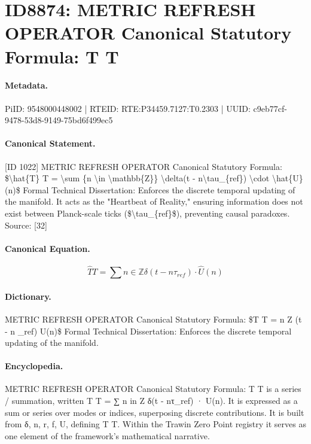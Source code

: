 \section*{ID8874: METRIC REFRESH OPERATOR Canonical Statutory Formula: T T}
\paragraph{Metadata.}
PiID: 9548000448002 | RTEID: RTE:P34459.7127:T0.2303 | UUID: c9eb77cf-9478-53d8-9149-75bd6f499ec5

\paragraph{Canonical Statement.}
[ID 1022] METRIC REFRESH OPERATOR Canonical Statutory Formula: \$\textbackslash{}hat\{T\} T = \textbackslash{}sum \{n \textbackslash{}in \textbackslash{}mathbb\{Z\}\} \textbackslash{}delta(t - n\textbackslash{}tau\_\{ref\}) \textbackslash{}cdot \textbackslash{}hat\{U\}(n)\$ Formal Technical Dissertation: Enforces the discrete temporal updating of the manifold. It acts as the "Heartbeat of Reality," ensuring information does not exist between Planck-scale ticks (\$\textbackslash{}tau\_\{ref\}\$), preventing causal paradoxes. Source: [32]

\paragraph{Canonical Equation.}
\[
\hat{T} T = \sum {n \in \mathbb{Z}} \delta(t - n\tau_{ref}) \cdot \hat{U}(n)
\]

\paragraph{Dictionary.}
METRIC REFRESH OPERATOR Canonical Statutory Formula: \$T T = n Z (t - n \_ref) U(n)\$ Formal Technical Dissertation: Enforces the discrete temporal updating of the manifold.

\paragraph{Encyclopedia.}
METRIC REFRESH OPERATOR Canonical Statutory Formula: T T is a series / summation, written T T = ∑ n in Z δ(t - nτ\_ref) · U(n). It is expressed as a sum or series over modes or indices, superposing discrete contributions. It is built from δ, n, r, f, U, defining T T. Within the Trawin Zero Point registry it serves as one element of the framework's mathematical narrative.
